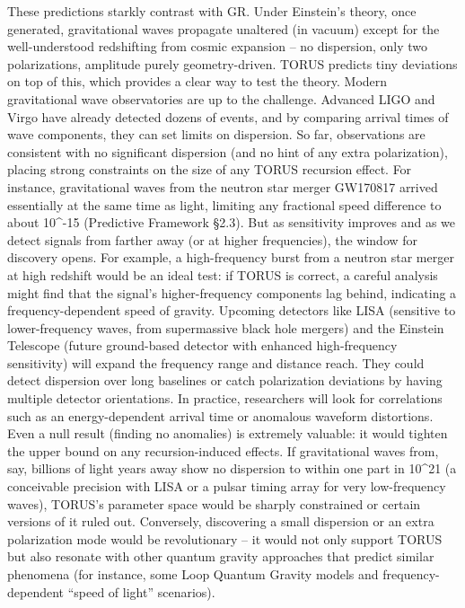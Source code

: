 \documentclass[]{article}
\begin{document}
These predictions starkly contrast with GR. Under Einstein's theory,
once generated, gravitational waves propagate unaltered (in vacuum)
except for the well-understood redshifting from cosmic expansion -- no
dispersion, only two polarizations, amplitude purely geometry-driven.
TORUS predicts tiny deviations on top of this, which provides a clear
way to test the theory. Modern gravitational wave observatories are up
to the challenge. Advanced LIGO and Virgo have already detected dozens
of events, and by comparing arrival times of wave components, they can
set limits on dispersion. So far, observations are consistent with no
significant dispersion (and no hint of any extra polarization), placing
strong constraints on the size of any TORUS recursion effect. For
instance, gravitational waves from the neutron star merger GW170817
arrived essentially at the same time as light, limiting any fractional
speed difference to about 10\^{}-15 (Predictive Framework §2.3). But as
sensitivity improves and as we detect signals from farther away (or at
higher frequencies), the window for discovery opens. For example, a
high-frequency burst from a neutron star merger at high redshift would
be an ideal test: if TORUS is correct, a careful analysis might find
that the signal's higher-frequency components lag behind, indicating a
frequency-dependent speed of gravity. Upcoming detectors like LISA
(sensitive to lower-frequency waves, from supermassive black hole
mergers) and the Einstein Telescope (future ground-based detector with
enhanced high-frequency sensitivity) will expand the frequency range and
distance reach. They could detect dispersion over long baselines or
catch polarization deviations by having multiple detector orientations.
In practice, researchers will look for correlations such as an
energy-dependent arrival time or anomalous waveform distortions. Even a
null result (finding no anomalies) is extremely valuable: it would
tighten the upper bound on any recursion-induced effects. If
gravitational waves from, say, billions of light years away show no
dispersion to within one part in 10\^{}21 (a conceivable precision with
LISA or a pulsar timing array for very low-frequency waves), TORUS's
parameter space would be sharply constrained or certain versions of it
ruled out. Conversely, discovering a small dispersion or an extra
polarization mode would be revolutionary -- it would not only support
TORUS but also resonate with other quantum gravity approaches that
predict similar phenomena (for instance, some Loop Quantum Gravity
models and frequency-dependent ``speed of light'' scenarios).
\end{document}
